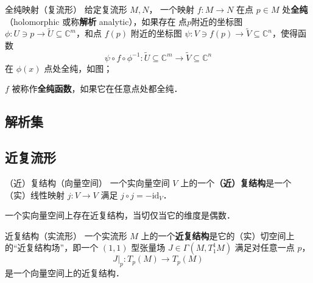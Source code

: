 
\begin{definition}{全纯映射（复流形）}
给定复流形 $M, N$， 一个映射 $f: M \to N$ 在点 $p \in M$ 处\textbf{全纯}（holomorphic 或称\textbf{解析} analytic），如果存在 点$p$附近的坐标图 $\phi: U \ni p \to \tilde{U} \subseteq \mathbb{C}^m$，和点 $f(p)$ 附近的坐标图 $\psi: V \ni f(p) \to \tilde{V} \subseteq \mathbb{C}^n$，使得函数
$$
\psi \circ f \circ \phi^{-1}: \tilde{U} \subseteq \mathbb{C}^m \to \tilde{V} \subseteq \mathbb{C}^n
$$
在 $\phi(x)$ 点处全纯，如图；

$f$ 被称作\textbf{全纯函数}，如果它在任意点处都全纯．
\end{definition}



\subsection{解析集}

\subsection{近复流形}

\begin{definition}{（近）复结构（向量空间）}
一个实向量空间 $V$ 上的一个\textbf{（近）复结构}是一个（实）线性映射 $j: V \to V$ 满足 $j \circ j = - \text{id}_V$．
\end{definition}

\begin{theorem}{}
一个实向量空间上存在近复结构，当切仅当它的维度是偶数．
\end{theorem}

\begin{definition}{近复结构（实流形）}
一个实流形 $M$ 上的一个\textbf{近复结构}是它的（实）切空间上的“近复结构场”，即一个 $(1, 1)$ 型张量场 $J \in \Gamma(M, T_1^1 M)$ 满足对任意一点 $p$， 
$$
J|_p: T_p(M) \to T_p(M)
$$
是一个向量空间上的近复结构．
\end{definition}






